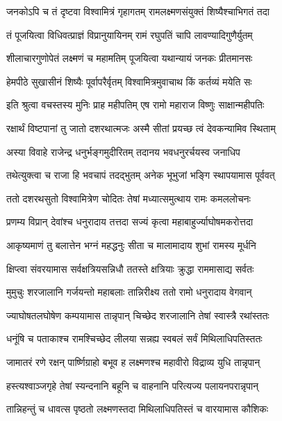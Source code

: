 \twolineshloka
{जनकोऽपि च तं दृष्टवा विश्वामित्रं गृहागतम्}
{रामलक्ष्मणसंयुक्तं शिष्यैश्चाभिगतं तदा} %

\twolineshloka
{तं पूजयित्वा विधिवत्प्राज्ञं विप्रानुयायिनम्}
{रामं रघुपतिं चापि लावण्यादिगुणैर्युतम्} %

\twolineshloka
{शीलाचारगुणोपेतं लक्ष्मणं च महामतिम्}
{पूजयित्वा यथान्यायं जनकः प्रीतमानसः} %

\twolineshloka
{हेमपीठे सुखासीनं शिष्यैः पूर्वापरैर्वृतम्}
{विश्वामित्रमुवाचाथ किं कर्तव्यं मयेति सः} %


\twolineshloka
{इति श्रुत्वा वचस्तस्य मुनिः प्राह महीपतिम्}
{एष रामो महाराज विष्णुः साक्षान्महीपतिः} %

\twolineshloka
{रक्षार्थं विष्टपानां तु जातो दशरथात्मजः}
{अस्मै सीतां प्रयच्छ त्वं देवकन्यामिव स्थिताम्} %

\twolineshloka
{अस्या विवाहे राजेन्द्र धनुर्भङ्गमुदीरितम्}
{तदानय भवधनुरर्चयस्व जनाधिप} %

\twolineshloka
{तथेत्युक्त्वा च राजा हि भवचापं तदद्भुतम्}
{अनेक भूभुजां भङ्गि स्थापयामास पूर्ववत्} %

\twolineshloka
{ततो दशरथसुतो विश्वामित्रेण चोदितः}
{तेषां मध्यात्समुत्थाय रामः कमललोचनः} %

\twolineshloka
{प्रणम्य विप्रान् देवांश्च धनुरादाय तत्तदा}
{सज्यं कृत्वा महाबाहुर्ज्याघोषमकरोत्तदा} %

\twolineshloka
{आकृष्यमाणं तु बलात्तेन भग्नं महद्धनुः}
{सीता च मालामादाय शुभां रामस्य मूर्धनि} %

\twolineshloka
{क्षिप्त्वा संवरयामास सर्वक्षत्रियसन्निधौ}
{ततस्ते क्षत्रियाः क्रुद्धा राममासाद्य सर्वतः} %

\twolineshloka
{मुमुचुः शरजालानि गर्जयन्तो महाबलाः}
{तान्निरीक्ष्य ततो रामो धनुरादाय वेगवान्} %

\twolineshloka
{ज्याघोषतलघोषेण कम्पयामास तान्नृपान्}
{चिच्छेद शरजालानि तेषां स्वास्त्रै रथांस्ततः} %

\twolineshloka
{धनूंषि च पताकाश्च रामश्चिच्छेद लीलया}
{सन्नह्य स्वबलं सर्वं मिथिलाधिपतिस्ततः} %

\twolineshloka
{जामातरं रणे रक्षन् पार्ष्णिग्राहो बभूव ह}
{लक्ष्मणश्च महावीरो विद्राव्य युधि तान्नृपान्} %

\twolineshloka
{हस्त्यश्वाञ्जगृहे तेषां स्यन्दनानि बहूनि च}
{वाहनानि परित्यज्य पलायनपरान्नृपान्} %

\twolineshloka
{तान्निहन्तुं च धावत्स पृष्ठतो लक्ष्मणस्तदा}
{मिथिलाधिपतिस्तं च वारयामास कौशिकः} %

